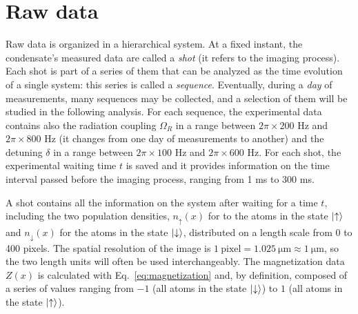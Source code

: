 
\section{Raw data}
Raw data is organized in a hierarchical system. At a fixed instant, the condensate's measured data are called a \textit{shot} (it refers to the imaging process). Each shot is part of a series of them that can be analyzed as the time evolution of a single system: this series is called a \textit{sequence}. Eventually, during a \textit{day} of measurements, many sequences may be collected, and a selection of them will be studied in the following analysis. For each sequence, the experimental data contains also the radiation coupling $\Omega_R$ in a range between $2\pi \times 200$ \unit{\hertz} and $2\pi \times 800$ \unit{\hertz} (it changes from one day of measurements to another) and the detuning $\delta$ in a range between $2\pi \times 100$ \unit{\hertz} and $2\pi \times 600$ \unit{\hertz}. For each shot, the experimental waiting time $t$ is saved and it provides information on the time interval passed before the imaging process, ranging from 1 \unit{\milli\second} to 300 \unit{\milli\second}. 

A shot contains all the information on the system after waiting for a time $t$, including the two population densities, $n_\uparrow(x)$ for to the atoms in the state $\ket{\uparrow}$ and $n_\downarrow(x)$ for the atoms in the state $\ket{\downarrow}$, distributed on a length scale from 0 to 400 pixels. The spatial resolution of the image is $1\ \text{pixel} = 1.025\ \unit{\micro\meter} \approx 1\ \unit{\micro\meter}$, so the two length units will often be used interchangeably. The magnetization data $Z(x)$ is calculated with Eq.\ \eqref{eq:magnetization} and, by definition, composed of a series of values ranging from $-1$ (all atoms in the state $\ket{\downarrow}$) to $1$ (all atoms in the state $\ket{\uparrow}$).

